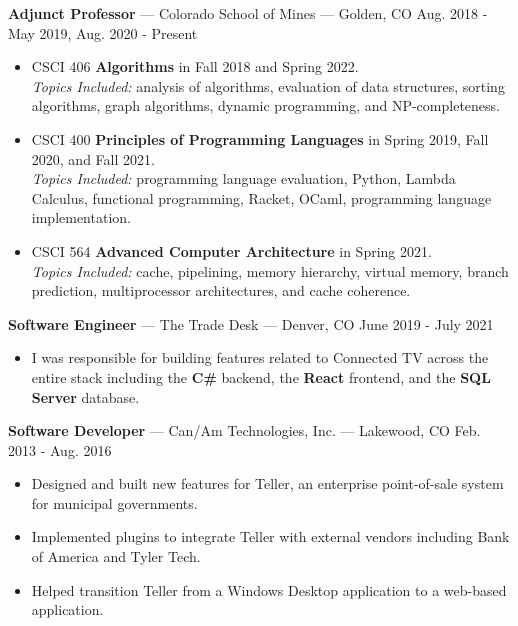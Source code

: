 \documentclass[10pt,letterpaper]{article}
\begin{document}
\textbf{Adjunct Professor} --- Colorado School of Mines --- Golden, CO
\hfill Aug. 2018 - May 2019, Aug. 2020 - Present
\begin{itemize}
    \item CSCI 406 \textbf{Algorithms} in Fall 2018 and Spring 2022. \\
        \textit{Topics Included:} analysis of algorithms, evaluation of data
        structures, sorting algorithms, graph algorithms, dynamic programming,
        and NP-completeness.
    \item CSCI 400 \textbf{Principles of Programming Languages} in Spring
        2019, Fall 2020, and Fall 2021. \\
        \textit{Topics Included:} programming language evaluation, Python,
        Lambda Calculus, functional programming, Racket, OCaml, programming
        language implementation.
    \item CSCI 564 \textbf{Advanced Computer Architecture} in Spring
        2021. \\
        \textit{Topics Included:} cache, pipelining, memory hierarchy, virtual
        memory, branch prediction, multiprocessor architectures, and cache
        coherence.
\end{itemize}

\textbf{Software Engineer} --- The Trade Desk --- Denver, CO
\hfill June 2019 - July 2021
\begin{itemize}
    \item I was responsible for building features related to Connected TV across
        the entire stack including the \textbf{C\#} backend, the \textbf{React}
        frontend, and the \textbf{SQL Server} database.
\end{itemize}




\vspace{2pt}
\textbf{Software Developer} --- Can/Am Technologies, Inc. --- Lakewood, CO
\hfill Feb. 2013 - Aug. 2016
\begin{itemize}
    \item Designed and built new features for Teller, an enterprise
        point-of-sale system for municipal governments.
    \item Implemented plugins to integrate Teller with external vendors
        including Bank of America and Tyler Tech.
    \item Helped transition Teller from a Windows Desktop application to a
        web-based application.
\end{itemize}
\end{document}
